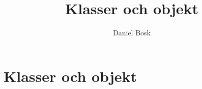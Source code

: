 \documentclass[a4paper,10pt,oneside,openright,
               oldfontcommands]{memoir}
\begin{document}
\title{%
  Klasser och objekt
}
\author{Daniel Bosk}

\maketitle

\begin{abstract}
  
\end{abstract}

\clearpage

\tableofcontents*

\chapter{Klasser och objekt}



\appendix


\printbibliography
\end{document}
